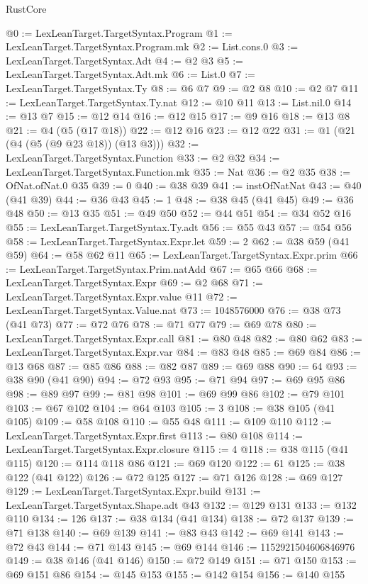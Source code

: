 \begin{lexlean}{RustCore}
\begin{coremodule}
@0 := LexLeanTarget.TargetSyntax.Program
@1 := LexLeanTarget.TargetSyntax.Program.mk
@2 := List.cons.{0}
@3 := LexLeanTarget.TargetSyntax.Adt
@4 := @2 @3
@5 := LexLeanTarget.TargetSyntax.Adt.mk
@6 := List.{0}
@7 := LexLeanTarget.TargetSyntax.Ty
@8 := @6 @7
@9 := @2 @8
@10 := @2 @7
@11 := LexLeanTarget.TargetSyntax.Ty.nat
@12 := @10 @11
@13 := List.nil.{0}
@14 := @13 @7
@15 := @12 @14
@16 := @12 @15
@17 := @9 @16
@18 := @13 @8
@21 := @4 (@5 (@17 @18))
@22 := @12 @16
@23 := @12 @22
@31 := @1 (@21 (@4 (@5 (@9 @23 @18)) (@13 @3)))
@32 := LexLeanTarget.TargetSyntax.Function
@33 := @2 @32
@34 := LexLeanTarget.TargetSyntax.Function.mk
@35 := Nat
@36 := @2 @35
@38 := OfNat.ofNat.{0} @35
@39 := 0
@40 := @38 @39
@41 := instOfNatNat
@43 := @40 (@41 @39)
@44 := @36 @43
@45 := 1
@48 := @38 @45 (@41 @45)
@49 := @36 @48
@50 := @13 @35
@51 := @49 @50
@52 := @44 @51
@54 := @34 @52 @16
@55 := LexLeanTarget.TargetSyntax.Ty.adt
@56 := @55 @43
@57 := @54 @56
@58 := LexLeanTarget.TargetSyntax.Expr.let
@59 := 2
@62 := @38 @59 (@41 @59)
@64 := @58 @62 @11
@65 := LexLeanTarget.TargetSyntax.Expr.prim
@66 := LexLeanTarget.TargetSyntax.Prim.natAdd
@67 := @65 @66
@68 := LexLeanTarget.TargetSyntax.Expr
@69 := @2 @68
@71 := LexLeanTarget.TargetSyntax.Expr.value @11
@72 := LexLeanTarget.TargetSyntax.Value.nat
@73 := 1048576000
@76 := @38 @73 (@41 @73)
@77 := @72 @76
@78 := @71 @77
@79 := @69 @78
@80 := LexLeanTarget.TargetSyntax.Expr.call
@81 := @80 @48
@82 := @80 @62
@83 := LexLeanTarget.TargetSyntax.Expr.var
@84 := @83 @48
@85 := @69 @84
@86 := @13 @68
@87 := @85 @86
@88 := @82 @87
@89 := @69 @88
@90 := 64
@93 := @38 @90 (@41 @90)
@94 := @72 @93
@95 := @71 @94
@97 := @69 @95 @86
@98 := @89 @97
@99 := @81 @98
@101 := @69 @99 @86
@102 := @79 @101
@103 := @67 @102
@104 := @64 @103
@105 := 3
@108 := @38 @105 (@41 @105)
@109 := @58 @108
@110 := @55 @48
@111 := @109 @110
@112 := LexLeanTarget.TargetSyntax.Expr.first
@113 := @80 @108
@114 := LexLeanTarget.TargetSyntax.Expr.closure
@115 := 4
@118 := @38 @115 (@41 @115)
@120 := @114 @118 @86
@121 := @69 @120
@122 := 61
@125 := @38 @122 (@41 @122)
@126 := @72 @125
@127 := @71 @126
@128 := @69 @127
@129 := LexLeanTarget.TargetSyntax.Expr.build
@131 := LexLeanTarget.TargetSyntax.Shape.adt @43
@132 := @129 @131
@133 := @132 @110
@134 := 126
@137 := @38 @134 (@41 @134)
@138 := @72 @137
@139 := @71 @138
@140 := @69 @139
@141 := @83 @43
@142 := @69 @141
@143 := @72 @43
@144 := @71 @143
@145 := @69 @144
@146 := 1152921504606846976
@149 := @38 @146 (@41 @146)
@150 := @72 @149
@151 := @71 @150
@153 := @69 @151 @86
@154 := @145 @153
@155 := @142 @154
@156 := @140 @155

\end{coremodule}
\end{lexlean}
